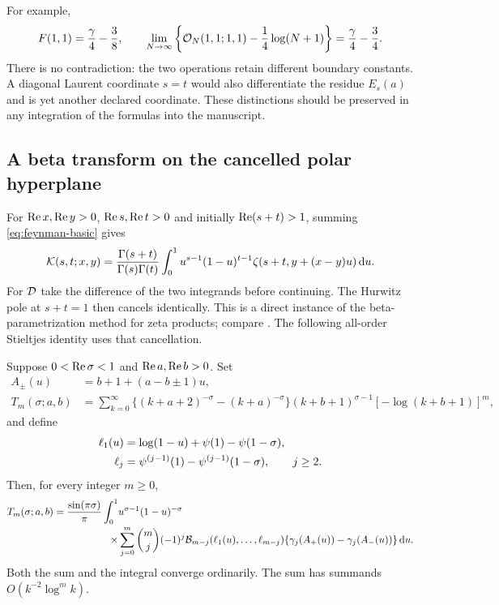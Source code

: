 For example,
\[
 F(1,1)=\frac{\gamma}{4}-\frac38,\qquad
 \lim_{N\to\infty}\left\{\mathcal O_N(1,1;1,1)-\frac14\log(N+1)\right\}
 =\frac{\gamma}{4}-\frac34.
\]
There is no contradiction: the two operations retain different
boundary constants. A diagonal Laurent coordinate $s=t$ would also
differentiate the residue $E_s(a)$ and is yet another declared
coordinate. These distinctions should be preserved in any integration
of the formulas into the manuscript.

\subsection{A beta transform on the cancelled polar hyperplane}

For $\operatorname{Re} x,\operatorname{Re} y>0$, $\operatorname{Re} s,\operatorname{Re} t>0$ and initially
$\operatorname{Re}(s+t)>1$, summing
\eqref{eq:feynman-basic} gives
\begin{equation}\label{eq:k-beta}
 \mathcal K(s,t;x,y)=\frac{\Gamma(s+t)}{\Gamma(s)\Gamma(t)}
 \int_0^1u^{s-1}(1-u)^{t-1}
       \zeta(s+t,y+(x-y)u)\,\mathrm d u.
\end{equation}
For $\mathcal D$ take the difference of the two integrands before
continuing. The Hurwitz pole at $s+t=1$ then cancels identically.
This is a direct instance of the beta-parametrization method for
zeta products; compare \cite{shpot-paris}. The following all-order
Stieltjes identity uses that cancellation.

\begin{theorem}\label{thm:beta-stieltjes}
Suppose $0<\operatorname{Re}\sigma<1$ and $\operatorname{Re} a,\operatorname{Re} b>0$. Set
\begin{align*}
 A_\pm(u)&=b+1+(a-b\pm1)u,\\
 T_m(\sigma;a,b)&=\sum_{k=0}^{\infty}
 \{(k+a+2)^{-\sigma}-(k+a)^{-\sigma}\}
 (k+b+1)^{\sigma-1}[-\log(k+b+1)]^m,
\end{align*}
and define
\begin{align}
 \ell_1(u)&=\log(1-u)+\psi(1)-\psi(1-\sigma),\notag\\
 \ell_j&=\psi^{(j-1)}(1)-\psi^{(j-1)}(1-\sigma),\qquad j\ge2.
 \label{eq:beta-ells}
\end{align}
Then, for every integer $m\ge0$,
\begin{equation}\label{eq:beta-stieltjes-all}
 \begin{split}
 T_m(\sigma;a,b)=\frac{\sin(\pi\sigma)}{\pi}
 \int_0^1&u^{\sigma-1}(1-u)^{-\sigma}\\[-2pt]
 {}\times&\sum_{j=0}^{m}\binom mj(-1)^j
 \mathcal B_{m-j}(\ell_1(u),\ldots,\ell_{m-j})
 \{\gamma_j(A_+(u))-\gamma_j(A_-(u))\}\,\mathrm d u.
 \end{split}
\end{equation}
Both the sum and the integral converge ordinarily. The sum has
summands $O(k^{-2}\log^m k)$.
\end{theorem}

